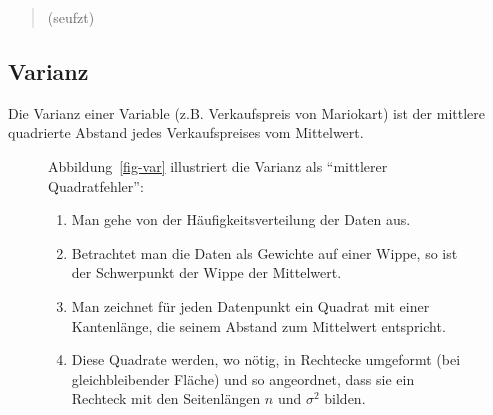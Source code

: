 \documentclass[
  letterpaper,
  twoside,
  open=any]{scrbook}
\providecommand{\tightlist}{%
  \setlength{\itemsep}{0pt}\setlength{\parskip}{0pt}}\usepackage{longtable,booktabs,array}
\theoremstyle{definition}
\theoremstyle{definition}
\theoremstyle{definition}
\theoremstyle{remark}
\begin{document}
\begin{quote}
{} (seufzt)
\end{quote}

\subsection{Varianz}\label{varianz}

Die Varianz einer Variable (z.B. Verkaufspreis von Mariokart) ist der
mittlere quadrierte Abstand jedes Verkaufspreises vom Mittelwert.

\begin{figure}

\begin{minipage}{0.60\linewidth}
Abbildung~\ref{fig-var} illustriert die Varianz als \enquote{mittlerer
Quadratfehler}:

\begin{enumerate}
\def\labelenumi{\arabic{enumi}.}
\tightlist
\item
  Man gehe von der Häufigkeitsverteilung der Daten aus.
\item
  Betrachtet man die Daten als Gewichte auf einer Wippe, so ist der
  Schwerpunkt der Wippe der Mittelwert.
\item
  Man zeichnet für jeden Datenpunkt ein Quadrat mit einer Kantenlänge,
  die seinem Abstand zum Mittelwert entspricht.
\item
  Diese Quadrate werden, wo nötig, in Rechtecke umgeformt (bei
  gleichbleibender Fläche) und so angeordnet, dass sie ein Rechteck mit
  den Seitenlängen \(n\) und \(\sigma^2\) bilden.
\end{enumerate}

\end{minipage}%
%
\begin{minipage}{0.40\linewidth}

\begin{figure}[H]

\centering{

}
\end{figure}
\end{minipage}
\end{figure}
\end{document}
